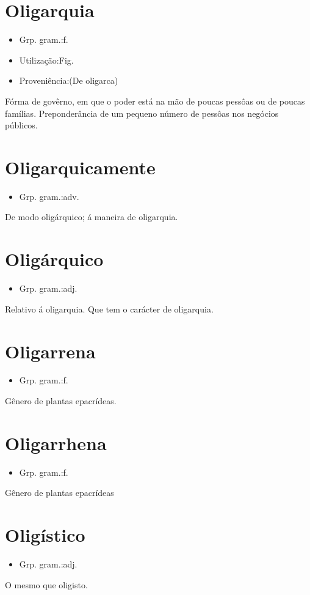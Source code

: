 \section{Oligarquia}
\begin{itemize}
\item {Grp. gram.:f.}
\end{itemize}
\begin{itemize}
\item {Utilização:Fig.}
\end{itemize}
\begin{itemize}
\item {Proveniência:(De \textunderscore oligarca\textunderscore )}
\end{itemize}
Fórma de govêrno, em que o poder está na mão de poucas pessôas ou de poucas famílias.
Preponderância de um pequeno número de pessôas nos negócios públicos.
\section{Oligarquicamente}
\begin{itemize}
\item {Grp. gram.:adv.}
\end{itemize}
De modo oligárquico; á maneira de oligarquia.
\section{Oligárquico}
\begin{itemize}
\item {Grp. gram.:adj.}
\end{itemize}
Relativo á oligarquia.
Que tem o carácter de oligarquia.
\section{Oligarrena}
\begin{itemize}
\item {Grp. gram.:f.}
\end{itemize}
Gênero de plantas epacrídeas.
\section{Oligarrhena}
\begin{itemize}
\item {Grp. gram.:f.}
\end{itemize}
Gênero de plantas epacrídeas
\section{Oligístico}
\begin{itemize}
\item {Grp. gram.:adj.}
\end{itemize}
O mesmo que \textunderscore oligisto\textunderscore .
